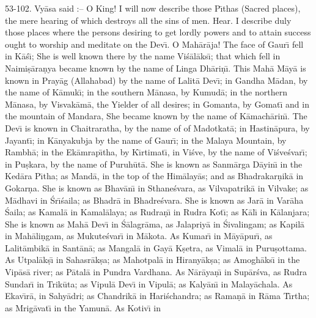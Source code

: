 53-102. Vy\=asa said :-- O King! I will now describe those P\={\i}thas (Sacred places), the mere hearing of which destroys all the sins of men. Hear. I describe duly those places where the persons desiring to get lordly powers and to attain success ought to worship and meditate on the Dev\={\i}. O Mah\=ar\=aja! The face of Gaur\={\i} fell in K\=a\'s\={\i}; She is well known there by the name Vi\'s\=al\=aks\={\i}; that which fell in Naimi\d{s}\=ara\d{n}ya became known by the name of Linga Dh\=ari\d{n}\={\i}. This Mah\=a M\=ay\=a is known in Pray\=ag (Allahabad) by the name of Lalit\=a Dev\={\i}; in Gandha M\=adan, by the name of K\=amuk\={\i}; in the southern M\=anasa, by Kumud\=a; in the northern M\=anasa, by Visvak\=am\=a, the Yielder of all desires; in Gomanta, by Gomat\={\i} and in the mountain of Mandara, She became known by the name of K\=amach\=arin\={\i}. The Dev\={\i} is known in Chaitraratha, by the name of of Madotkat\=a; in Hastin\=apura, by Jayant\={\i}; in K\=anyakubja by the name of Gaur\={\i}; in the Malaya Mountain, by Rambh\=a; in the Ek\=amrap\={\i}tha, by K\={\i}rtimat\={\i}, in Vi\'sve, by the name of Vi\'sve\'svar\={\i}; in Pu\d{s}kara, by the name of Puruh\=ut\=a. She is known as Sanm\=arga D\=ayin\={\i} in the Ked\=ara P\={\i}tha; as Mand\=a, in the top of the Him\=alay\=as; and as Bhadrakar\d{n}ik\=a in Gokar\d{n}a. She is known as Bhav\=an\={\i} in Sthane\'svara, as Vilvapatrik\=a in Vilvake; as M\=adhavi in \'Sr\={\i}\'saila; as Bhadr\=a in Bhadre\'svara. She is known as Jar\=a in Var\=aha \'Saila; as Kamal\=a in Kamal\=alaya; as Rudra\d{n}\={\i} in Rudra Kot\={\i}; as K\=al\={\i} in K\=alanjara; She is known as Mah\=a Dev\={\i} in \'S\=alagr\=ama, as Jalapriy\=a in \'Sivalingam; as Kapil\=a in Mah\=ali\d{n}gam, as Mukute\'svar\={\i} in M\=akota. As Kumar\={\i} in M\=ay\=apur\={\i}, as Lalit\=ambik\=a in Sant\=an\=a; as Mangal\=a in Gay\=a K\d{s}etra, as Vimal\=a in Puru\d{s}ottama. As Utpal\=ak\d{s}\={\i} in Sahasr\=ak\d{s}a; as Mahotpal\=a in Hirany\=ak\d{s}a; as Amogh\=aks\={\i} in the Vip\=as\=a river; as P\=atal\=a in Pundra Vardhana. As N\=ar\=aya\d{n}\={\i} in Sup\=ar\'sva, as Rudra Sundar\={\i} in Trik\=uta; as Vipul\=a Dev\={\i} in Vipul\=a; as Kaly\=an\={\i} in Malay\=achala. As Ekav\={\i}r\=a, in Sahy\=adri; as Chandrik\=a in Hari\'schandra; as Rama\d{n}\=a in R\=ama T\={\i}rtha; as Mrig\=avat\={\i} in the Yamun\=a. As Kotiv\={\i} in

